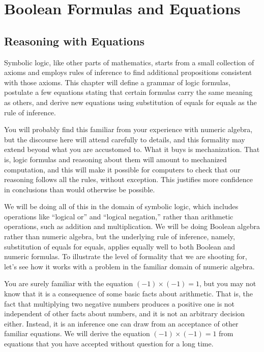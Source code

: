 \chapter{Boolean Formulas and Equations}
\label{ch:Boolean-Formulas}

\section{Reasoning with Equations}
\label{sec:math-and-equations}
Symbolic logic,
like other parts of mathematics, starts from a small
collection of axioms and employs rules of inference to find
additional propositions consistent with those axioms. This
chapter will define a grammar of logic formulas, postulate a few
equations stating that certain formulas carry the same meaning as others,
and derive new equations
using substitution of equals for equals as the rule of
inference.

You will probably find this familiar from your
experience with numeric algebra, but the discourse here will attend carefully
to details, and this formality may extend beyond what you are
accustomed to. What it buys is mechanization. That is,
logic formulas and reasoning about them will amount to
mechanized computation, and this will make it possible for
computers to check that our reasoning follows all the rules,
without exception. This justifies more confidence
in conclusions than would otherwise be possible.

We will be doing all of this in the domain of symbolic logic, which
includes operations like ``logical or'' and ``logical negation,''
rather than arithmetic operations, such as addition and
multiplication.
We will be doing Boolean algebra rather than numeric algebra,
but the underlying rule of inference, namely,
substitution
of equals for equals,
applies equally well to both Boolean and numeric formulas.
To illustrate the level of formality that we are shooting for,
let's see how it works with a problem
in the familiar domain of numeric algebra.

You are surely familiar with the equation $(-1) \times (-1) = 1$, but you may
not know that it is a consequence of some basic facts about
arithmetic.
That is, the fact that multiplying two
negative numbers produces a positive one
is not independent of other facts about numbers,
and it is not an arbitrary decision either.
Instead, it is an inference one can draw
from an acceptance of other familiar equations.
We will derive the equation $(-1)\times(-1) = 1$
from equations that you have accepted without question for a long time.

